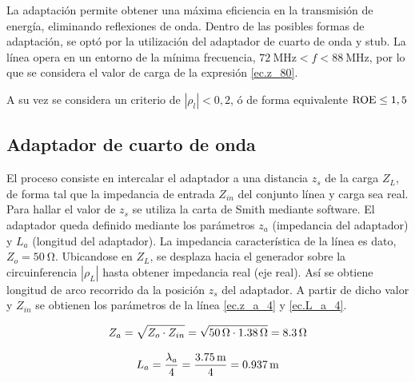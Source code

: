 La adaptación permite obtener una máxima eficiencia en la transmisión de energía, eliminando reflexiones de onda. Dentro de las posibles formas de adaptación, se optó por la utilización del adaptador de cuarto de onda y stub. La línea opera en un entorno de la mínima frecuencia, $\SI{72}{\mega\hertz} < f < \SI{88}{\mega\hertz}$, por lo que se considera el valor de carga de la expresión \eqref{ec.z_80}.

A su vez se considera un criterio de $|\rho_l|<0,2$, ó de forma equivalente $\rm{ROE} \leq 1,5$

\subsection{Adaptador de cuarto de onda}
El proceso consiste en intercalar el adaptador a una distancia $z_s$ de la carga $Z_L$, de forma tal que la impedancia de entrada $Z_{in}$ del conjunto línea y carga sea real. Para hallar el valor de $z_s$ se utiliza la carta de Smith mediante software. El adaptador queda definido mediante los parámetros $z_a$ (impedancia del adaptador) y $L_a$ (longitud del adaptador). La impedancia característica de la línea es dato, $Z_o = \SI{50}{\ohm}$. Ubicandose en $Z_L$, se desplaza hacia el generador sobre la circuinferencia $|\rho_L|$ hasta obtener impedancia real (eje real). Así se obtiene longitud de arco recorrido da la posición $z_s$ del adaptador. A partir de dicho valor y $Z_{in}$ se obtienen los parámetros de la línea \eqref{ec.z_a_4} y \eqref{ec.L_a_4}.

\begin{equation}
	\centering
	Z_a = \sqrt{Z_o \cdot Z_{in}} = \sqrt{ \SI{50}{\ohm} \cdot \SI{1.38}{\ohm} } = \SI{8.3}{\ohm}
	\label{ec.z_a_4}
\end{equation}	

\begin{equation}
	\centering
	L_a = \frac{\lambda_a}{4} = \frac{ \SI{3.75}{\meter} }{4} = \SI{0.937}{\meter}
	\label{ec.L_a_4}
\end{equation}

